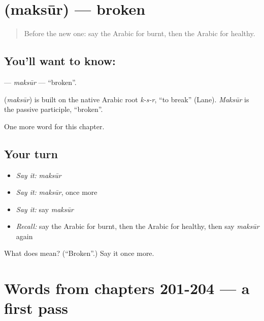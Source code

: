 \section[\texorpdfstring{\ar{مكسور} (maksūr)}{مكسور (maksūr)}]{ (maksūr) — broken}

\label{lesson:AR-C209-maksur}



\begin{quote}
Before the new one: say the Arabic for burnt, then the Arabic for healthy.
\end{quote}

\subsection*{You'll want to know: }
\textbf{} — \emph{maksūr} — \textquotedblleft{}broken\textquotedblright{}.

\begin{cousinweb}
\textbf{} (\emph{maksūr}) is built on the native Arabic root \emph{k-s-r}, \textquotedblleft{}to break\textquotedblright{} (Lane). \emph{Maksūr} is the passive participle, \textquotedblleft{}broken\textquotedblright{}.
\end{cousinweb}

\begin{grammarlens}[title={What you've built}]
One more word for this chapter.
\end{grammarlens}

\subsection*{Your turn}
\begin{itemize}
\raggedright
  \item \emph{Say it:} \emph{maksūr}
  \item \emph{Say it:} \emph{maksūr}, once more
  \item \emph{Say it:} say \emph{maksūr}
  \item \emph{Recall:} say the Arabic for burnt, then the Arabic for healthy, then say \emph{maksūr} again
\end{itemize}

\begin{tcolorbox}[breakable,colback=teal!4,colframe=teal!35!black,title={Before you move on}]
What does  mean? (\textquotedblleft{}Broken\textquotedblright{}.) Say it once more.
\end{tcolorbox}
\section[(dialogue)]{Words from chapters 201-204 — a first pass}


